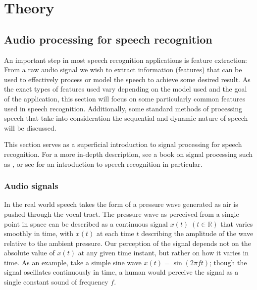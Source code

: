 %
%
%

\chapter{Theory}

\section{Audio processing for speech recognition}

An important step in most speech recognition applications is feature extraction: From a raw audio signal we wish to extract information (features) that can be used to effectively process or model the speech to achieve some desired result.
As the exact types of features used vary depending on the model used and the goal of the application, this section will focus on some particularly common features used in speech recognition.
Additionally, some standard methods of processing speech that take into consideration the sequential and dynamic nature of speech will be discussed.

This section serves as a superficial introduction to signal processing for speech recognition.
For a more in-depth description, see a book on signal processing such as \textcite{quatieri2002discrete}, or see \textcite{huang2001spoken} for an introduction to speech recognition in particular.

\subsection{Audio signals}

In the real world speech takes the form of a pressure wave generated as air is pushed through the vocal tract.
The pressure wave as perceived from a single point in space can be described as a continuous signal $x(t)\; (t\in \mathbb{R})$  that varies smoothly in time, with $x(t)$ at each time $t$ describing the amplitude of the wave relative to the ambient pressure.
Our perception of the signal depends not on the absolute value of $x(t)$ at any given time instant, but rather on how it varies in time.
As an example, take a simple sine wave $x(t) = \sin(2\pi f t)$; though the signal oscillates continuously in time, a human would perceive the signal as a single constant sound of frequency $f$.

